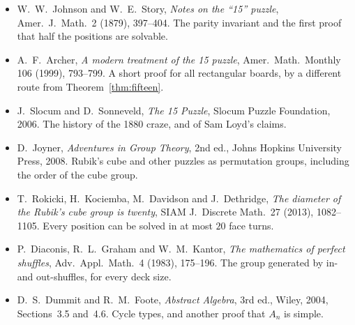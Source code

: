 \begin{itemize}
\item W.~W.~Johnson and W.~E.~Story, \emph{Notes on the ``15'' puzzle}, Amer.\ J.\ Math.\ 2 (1879), 397--404. The parity invariant and the first proof that half the positions are solvable.
\item A.~F.~Archer, \emph{A modern treatment of the 15 puzzle}, Amer.\ Math.\ Monthly 106 (1999), 793--799. A short proof for all rectangular boards, by a different route from Theorem~\ref{thm:fifteen}.
\item J.~Slocum and D.~Sonneveld, \emph{The 15 Puzzle}, Slocum Puzzle Foundation, 2006. The history of the 1880 craze, and of Sam Loyd's claims.
\item D.~Joyner, \emph{Adventures in Group Theory}, 2nd ed., Johns Hopkins University Press, 2008. Rubik's cube and other puzzles as permutation groups, including the order of the cube group.
\item T.~Rokicki, H.~Kociemba, M.~Davidson and J.~Dethridge, \emph{The diameter of the Rubik's cube group is twenty}, SIAM J.\ Discrete Math.\ 27 (2013), 1082--1105. Every position can be solved in at most $20$ face turns.
\item P.~Diaconis, R.~L.~Graham and W.~M.~Kantor, \emph{The mathematics of perfect shuffles}, Adv.\ Appl.\ Math.\ 4 (1983), 175--196. The group generated by in- and out-shuffles, for every deck size.
\item D.~S.~Dummit and R.~M.~Foote, \emph{Abstract Algebra}, 3rd ed., Wiley, 2004, Sections~3.5 and~4.6. Cycle types, and another proof that $A_n$ is simple.
\end{itemize}
